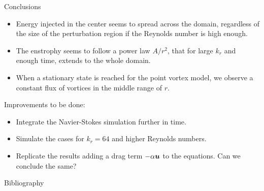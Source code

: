 \documentclass{beamer} %
\begin{document}
\begin{frame}{Conclusions}
	\begin{itemize}
		\item Energy injected in the center seems to spread across the domain, regardless of the size of the perturbation region if the Reynolds number is high enough.
		\item The enstrophy seems to follow a power law $A/r^2$, that for large $k_r$ and enough time, extends to the whole domain.
		\item When a stationary state is reached for the point vortex model, we observe a constant flux of vortices in the middle range of $r$.
	\end{itemize}

	Improvements to be done:
	\begin{itemize}
		\item Integrate the Navier-Stokes simulation further in time.
		\item Simulate the cases for $k_r= 64$ and higher Reynolds numbers.
		\item Replicate the results adding a drag term $-\alpha \boldsymbol{u}$ to the equations. Can we conclude the same?
	\end{itemize}
\end{frame}

\thispagestyle{empty}
\begin{frame}[noframenumbering]{Bibliography}
	\printbibliography
	\vspace{4cm}
\end{frame}
\end{document}
